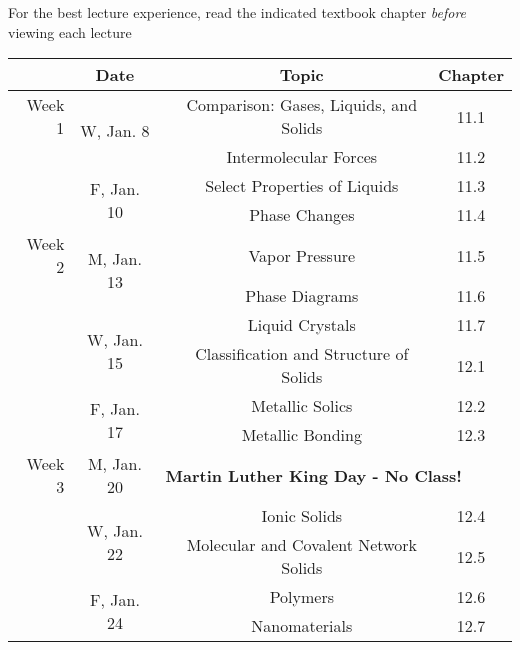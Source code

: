 \documentclass[12pt, letterpaper]{article}
\begin{document}
\noindent For the best lecture experience, read the indicated textbook chapter \emph{before} viewing each lecture

\begin{tabular}{rcccc}
& Date && Topic & Chapter\\
\midrule
Week 1 & \multirow{2}{*}{W, Jan. 8}& & Comparison: Gases, Liquids, and Solids & 11.1\\
& & & Intermolecular Forces & 11.2\\
& \multirow{2}{*}{F, Jan. 10}& & Select Properties of Liquids & 11.3\\
& & & Phase Changes & 11.4\\
\midrule
Week 2 & \multirow{2}{*}{M, Jan. 13}& & Vapor Pressure & 11.5\\
& & & Phase Diagrams & 11.6\\
& \multirow{2}{*}{W, Jan. 15}& & Liquid Crystals & 11.7\\
& & & Classification and Structure of Solids & 12.1\\
& \multirow{2}{*}{F, Jan. 17}& & Metallic Solics & 12.2\\
& & & Metallic Bonding & 12.3\\
\midrule
Week 3 & M, Jan. 20& \multicolumn{3}{l}{\textbf{Martin Luther King Day - No Class!}}\\
& \multirow{2}{*}{W, Jan. 22}& & Ionic Solids & 12.4\\
& & & Molecular and Covalent Network Solids & 12.5\\
& \multirow{2}{*}{F, Jan. 24}& & Polymers & 12.6\\
& & & Nanomaterials & 12.7\\
\end{tabular}
\end{document}
